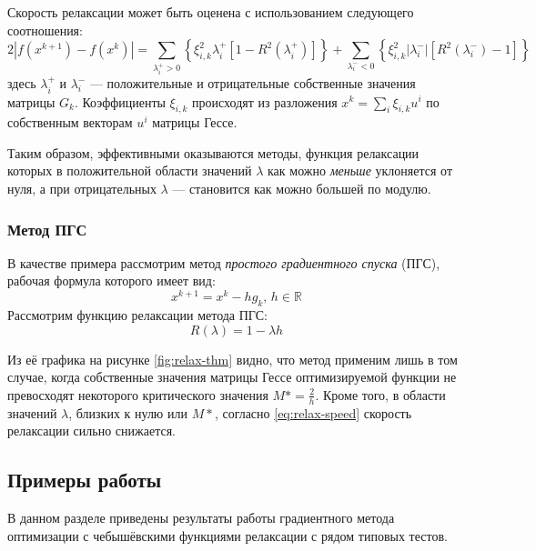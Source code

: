 \documentclass{article}
\providecommand{\neword}{\emph}
\providecommand{\abs}[1]{\left \lvert{#1}\right \rvert}
\providecommand{\set}[1]{\mathbb{#1}}
\theoremstyle{remark}
\theoremstyle{definition}
\numberwithin{equation}{section}
\begin{document}


Скорость релаксации может быть оценена с использованием следующего
соотношения:
\begin{equation}
  \label{eq:relax-speed}
  2\abs{f(x^{k+1})-f(x^k)}=\sum_{\lambda_i^+>0} \left\{\xi_{i,k}^2
    \lambda_i^+ [1-R^2(\lambda_i^+)]\right\} + \sum_{\lambda_i^-<0} \left\{\xi_{i,k}^2
    \abs{\lambda_i^-} [R^2(\lambda_i^-)-1]\right\}
\end{equation}
здесь $\lambda_i^+$ и $\lambda_i^-$ — положительные и отрицательные
собственные значения матрицы $G_k$. Коэффициенты $\xi_{i,k}$
происходят из разложения $x^k=\sum_i{\xi_{i,k}u^i}$ по собственным
векторам $u^i$ матрицы Гессе.

Таким образом, эффективными оказываются методы, функция релаксации
которых в положительной области значений $\lambda$ как можно
\emph{меньше} уклоняется от нуля, а при отрицательных $\lambda$ —
становится как можно большей по модулю.

\subsubsection{Метод ПГС}

В качестве примера рассмотрим метод \neword{простого градиентного
  спуска} (ПГС), рабочая формула которого имеет вид:
\begin{equation*}
  x^{k+1}=x^k-hg_k,\, h\in\set{R}
\end{equation*}
Рассмотрим функцию релаксации метода ПГС:
\begin{equation*}
  R(\lambda) = 1 - \lambda h
\end{equation*}



Из её графика на рисунке \ref{fig:relax-thm} видно, что метод применим
лишь в том случае, когда собственные значения матрицы Гессе
оптимизируемой функции не превосходят некоторого критического значения
$M*=\frac{2}{h}$. Кроме того, в области значений $\lambda$, близких к
нулю или $M*$, согласно \eqref{eq:relax-speed} скорость релаксации
сильно снижается.

\clearpage
\subsection{Примеры работы}

В данном разделе приведены результаты работы градиентного метода
оптимизации с чебышёвскими функциями релаксации с рядом типовых
тестов.
\end{document}
